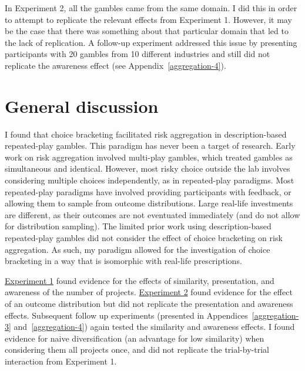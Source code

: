 \documentclass[a4paper, nobind, dvipsnames]{templates/ociamthesis}
\theoremstyle{definition}
\theoremstyle{definition}
\theoremstyle{definition}
\theoremstyle{definition}
\theoremstyle{remark}
\begin{document}
In Experiment 2, all the gambles came from the same domain. I did this in order
to attempt to replicate the relevant effects from Experiment 1. However, it may
be the case that there was something about that particular domain that led to
the lack of replication. A follow-up experiment addressed this issue by
presenting participants with 20 gambles from 10 different industries and still
did not replicate the awareness effect (see Appendix~\ref{aggregation-4}).

\section{General discussion}

I found that choice bracketing facilitated risk aggregation in description-based
repeated-play gambles. This paradigm has never been a target of research. Early
work on risk aggregation involved multi-play gambles, which treated gambles as
simultaneous and identical. However, most risky choice outside the lab involves
considering multiple choices independently, as in repeated-play paradigms. Most
repeated-play paradigms have involved providing participants with feedback, or
allowing them to sample from outcome distributions. Large real-life investments
are different, as their outcomes are not eventuated immediately (and do not
allow for distribution sampling). The limited prior work using description-based
repeated-play gambles did not consider the effect of choice bracketing on risk
aggregation. As such, my paradigm allowed for the investigation of choice
bracketing in a way that is isomorphic with real-life prescriptions.

\protect\hyperlink{aggregation-1}{Experiment 1} found evidence for the effects of similarity,
presentation, and awareness of the number of projects. \protect\hyperlink{aggregation-2}{Experiment
2} found evidence for the effect of an outcome distribution but
did not replicate the presentation and awareness effects. Subsequent follow up
experiments (presented in Appendices~\ref{aggregation-3}
and~\ref{aggregation-4}) again tested the similarity and awareness effects. I
found evidence for naive diversification (an advantage for low similarity) when
considering them all projects once, and did not replicate the trial-by-trial
interaction from Experiment 1.
\end{document}

